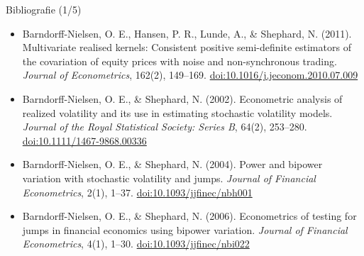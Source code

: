 \begin{frame}{Bibliografie (1/5)}
\begin{itemize}
    \item Barndorff-Nielsen, O. E., Hansen, P. R., Lunde, A., \& Shephard, N. (2011). Multivariate realised kernels: Consistent positive semi-definite estimators of the covariation of equity prices with noise and non-synchronous trading. \textit{Journal of Econometrics}, 162(2), 149--169. \href{https://doi.org/10.1016/j.jeconom.2010.07.009}{doi:10.1016/j.jeconom.2010.07.009}
    \item Barndorff-Nielsen, O. E., \& Shephard, N. (2002). Econometric analysis of realized volatility and its use in estimating stochastic volatility models. \textit{Journal of the Royal Statistical Society: Series B}, 64(2), 253--280. \href{https://doi.org/10.1111/1467-9868.00336}{doi:10.1111/1467-9868.00336}
    \item Barndorff-Nielsen, O. E., \& Shephard, N. (2004). Power and bipower variation with stochastic volatility and jumps. \textit{Journal of Financial Econometrics}, 2(1), 1--37. \href{https://doi.org/10.1093/jjfinec/nbh001}{doi:10.1093/jjfinec/nbh001}
    \item Barndorff-Nielsen, O. E., \& Shephard, N. (2006). Econometrics of testing for jumps in financial economics using bipower variation. \textit{Journal of Financial Econometrics}, 4(1), 1--30. \href{https://doi.org/10.1093/jjfinec/nbi022}{doi:10.1093/jjfinec/nbi022}
\end{itemize}
\end{frame}

